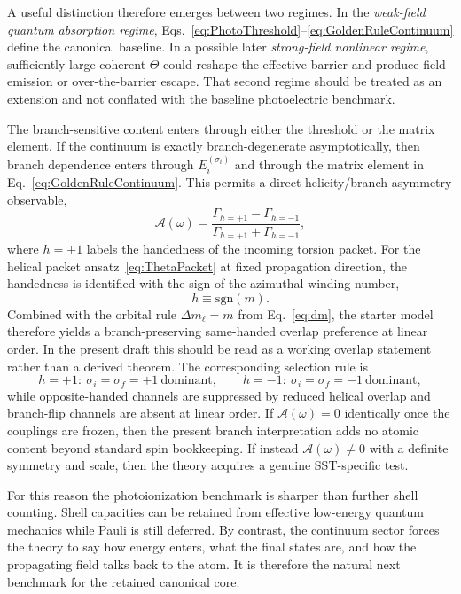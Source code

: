 \documentclass[11pt,a4paper]{article}
\begin{document}
A useful distinction therefore emerges between two regimes. In the \emph{weak-field quantum absorption regime}, Eqs.~\eqref{eq:PhotoThreshold}--\eqref{eq:GoldenRuleContinuum} define the canonical baseline. In a possible later \emph{strong-field nonlinear regime}, sufficiently large coherent $\Theta$ could reshape the effective barrier and produce field-emission or over-the-barrier escape. That second regime should be treated as an extension and not conflated with the baseline photoelectric benchmark.

The branch-sensitive content enters through either the threshold or the matrix element. If the continuum is exactly branch-degenerate asymptotically, then branch dependence enters through $E_i^{(\sigma_i)}$ and through the matrix element in Eq.~\eqref{eq:GoldenRuleContinuum}. This permits a direct helicity/branch asymmetry observable,
\begin{equation}
\label{eq:Asymmetry}
\boxed{
\mathcal A(\omega)
=
\frac{\Gamma_{h=+1}-\Gamma_{h=-1}}{\Gamma_{h=+1}+\Gamma_{h=-1}},
}
\end{equation}
where $h=\pm 1$ labels the handedness of the incoming torsion packet. For the helical packet ansatz~\eqref{eq:ThetaPacket} at fixed propagation direction, the handedness is identified with the sign of the azimuthal winding number,
\begin{equation}
\label{eq:h-sign-m}
\boxed{h\equiv \mathrm{sgn}(m).}
\end{equation}
Combined with the orbital rule $\Delta m_\ell=m$ from Eq.~\eqref{eq:dm}, the starter model therefore yields a branch-preserving same-handed overlap preference at linear order. In the present draft this should be read as a working overlap statement rather than a derived theorem. The corresponding selection rule is
\begin{equation}
\label{eq:handed-selection}
 h=+1:\ \sigma_i=\sigma_f=+1\ \text{dominant},
 \qquad
 h=-1:\ \sigma_i=\sigma_f=-1\ \text{dominant},
\end{equation}
while opposite-handed channels are suppressed by reduced helical overlap and branch-flip channels are absent at linear order. If $\mathcal A(\omega)=0$ identically once the couplings are frozen, then the present branch interpretation adds no atomic content beyond standard spin bookkeeping. If instead $\mathcal A(\omega)\neq 0$ with a definite symmetry and scale, then the theory acquires a genuine SST-specific test.

For this reason the photoionization benchmark is sharper than further shell counting. Shell capacities can be retained from effective low-energy quantum mechanics while Pauli is still deferred. By contrast, the continuum sector forces the theory to say how energy enters, what the final states are, and how the propagating field talks back to the atom. It is therefore the natural next benchmark for the retained canonical core.
\end{document}
